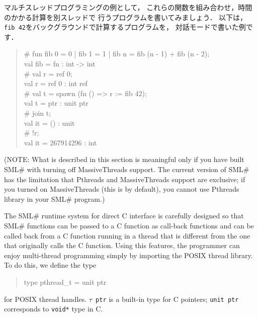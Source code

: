 \documentclass{jbook}
\newcommand{\smlsharp}{SML\#}
\newenvironment{program}{\begin{quote}\begin{tt}}%
                        {\end{tt}\end{quote}}
\begin{document}
	マルチスレッドプログラミングの例として，
これらの関数を組み合わせ，時間のかかる計算を別スレッドで
行うプログラムを書いてみましょう．
	以下は，{\tt fib 42}をバックグラウンドで計算するプログラムを，
対話モードで書いた例です．
\begin{program}
\# fun fib 0 = 0 | fib 1 = 1 | fib n = fib (n - 1) + fib (n - 2);\\
val fib = fn : int -> int\\
\# val r = ref 0;\\
val r = ref 0 : int ref\\
\# val t = spawn (fn () => r := fib 42);\\
val t = ptr : unit ptr\\
\# join t;\\
val it = () : unit\\
\# !r;\\
val it = 267914296 : int
\end{program}

\else%

	(NOTE: What is described in this section is meaningful only if
you have built \smlsharp{} with turning off MassiveThreads support.
	The current version of \smlsharp{} has the limitation that
Pthreads and MassiveThreads support are exclusive;
if you turned on MassiveThreads (this is by default),
you cannot use Pthreads library in your \smlsharp{} program.)

	The \smlsharp{} runtime system for direct C interface is
carefully designed so that \smlsharp{} functions can be passed to a C
function as call-back functions and can be called back from a C function
running in a thread that is different from the one that originally calls
the C function. 
	Using this features, the programmer can enjoy multi-thread
programming simply by importing the POSIX thread library.
	To do this, we define the type
\begin{program}
type pthread\_t = unit ptr
\end{program}
for POSIX thread handles.
	{\tt $\tau$ ptr} is a built-in type for C pointers;
{\tt unit ptr} corresponds to {\tt void*} type in C. 
\end{document}
